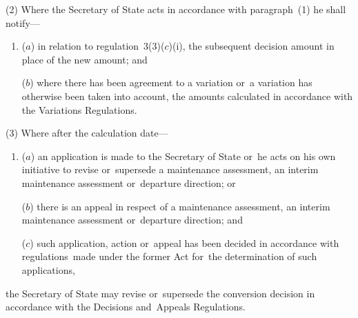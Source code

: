 \documentclass[12pt,a4paper]{article}
\begin{document}
(2) Where the Secretary of State acts in accordance with paragraph~(1) he shall notify—
\begin{enumerate}\item[]
($a$) in relation to regulation~3(3)($c$)(i), the subsequent decision amount in place of the new amount; and

($b$) where there has been agreement to a variation or~a variation has otherwise been taken into account, the amounts calculated in accordance with the Variations Regulations.
\end{enumerate}

(3) Where after the calculation date—
\begin{enumerate}\item[]
($a$) an application is made to the Secretary of State or~he acts on his own initiative to revise or~supersede a maintenance assessment, an interim maintenance assessment or~departure direction; or

($b$) there is an appeal in respect of a maintenance assessment, an interim maintenance assessment or~departure direction; and

($c$) such application, action or~appeal has been decided in accordance with regulations~made under the former Act for~the determination of such applications,
\end{enumerate}
the Secretary of State may revise or~supersede the conversion decision in accordance with the Decisions and~Appeals Regulations.

%
\end{document}
